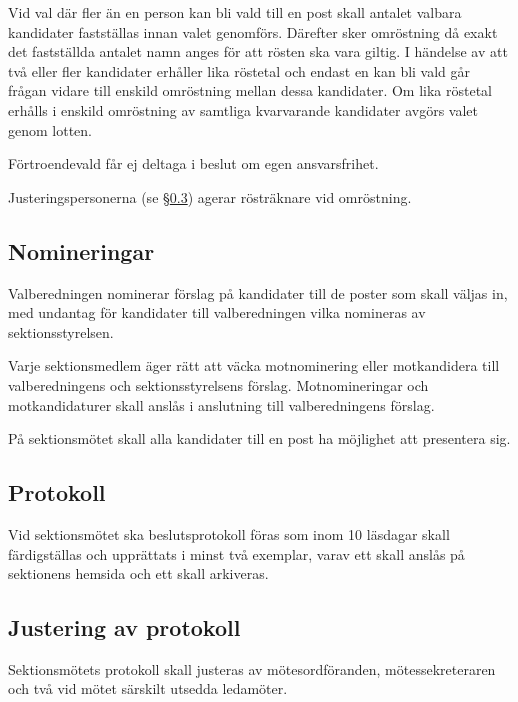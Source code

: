 \documentclass{datateknologsektionen-document}
\begin{document}
Vid val där fler än en person kan bli vald till en post skall antalet valbara kandidater
fastställas innan valet genomförs. Därefter sker omröstning då exakt det fastställda
antalet namn anges för att rösten ska vara giltig. I händelse av att två eller fler
kandidater erhåller lika röstetal och endast en kan bli vald går frågan vidare till
enskild omröstning mellan dessa kandidater. Om lika röstetal erhålls i enskild
omröstning av samtliga kvarvarande kandidater avgörs valet genom lotten.

Förtroendevald får ej deltaga i beslut om egen ansvarsfrihet.

Justeringspersonerna (se \S \ref{justeringavprotokoll}) agerar rösträknare vid omröstning.

\subsection{Nomineringar}
Valberedningen nominerar förslag på kandidater till de poster som skall väljas in,
med undantag för kandidater till valberedningen vilka nomineras av sektionsstyrelsen.

Varje sektionsmedlem äger rätt att väcka motnominering eller motkandidera till
valberedningens och sektionsstyrelsens förslag. Motnomineringar och motkandidaturer
skall anslås i anslutning till valberedningens förslag.

På sektionsmötet skall alla kandidater till en post ha möjlighet att presentera sig.

\subsection{Protokoll}
Vid sektionsmötet ska beslutsprotokoll föras som inom 10 läsdagar skall färdigställas
och upprättats i minst två exemplar, varav ett skall anslås på sektionens hemsida och ett
skall arkiveras.

\subsection{Justering av protokoll}
\label{justeringavprotokoll}
Sektionsmötets protokoll skall justeras av mötesordföranden, mötessekreteraren och två
vid mötet särskilt utsedda ledamöter.
\end{document}
